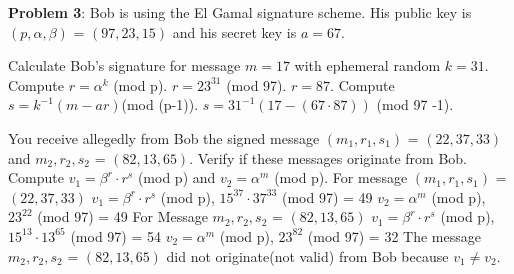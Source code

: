 \documentclass[12pt,letterpaper,final]{report}
\begin{document}
\bigskip

\noindent\textbf{Problem 3}: Bob is using the El Gamal signature scheme. His public key is $(p, \alpha, \beta)$ = $(97, 23, 15)$ and his secret key is $a = 67$.
\begin{alphlist}
	\item\indent Calculate Bob's signature for message $m = 17$ with ephemeral random $k = 31$.
	\newline
	 Compute $r = \alpha^{k}$ (mod p). $r = 23^{31}$ (mod 97). $ r = 87$.
	\newline\indent Compute $s = k^{-1}(m - ar)$(mod (p-1)). $s = 31^{-1}(17 - (67\cdot87))$ (mod 97 -1).
	\item\indent You receive allegedly from Bob the signed message $(m_{1}, r_{1}, s_{1})$ = $(22, 37, 33)$ and $m_{2}, r_{2}, s_{2}$ = $(82, 13, 65)$. Verify if these messages originate from Bob.
	\newline{} Compute $v_{1} = \beta^{r} \cdot r^{s}$ (mod p) and $v_{2} = \alpha^{m}$ (mod p).
	\newline For message $(m_{1}, r_{1}, s_{1})$ = $(22, 37, 33)$
	\newline $v_{1} = \beta^{r} \cdot r^{s}$ (mod p), $15^{37} \cdot 37^{33}$ (mod 97) = 49
	\newline $v_{2} = \alpha^{m}$ (mod p), $23^{22}$ (mod 97) = 49
	\newline For Message $m_{2}, r_{2}, s_{2}$ = $(82, 13, 65)$
	\newline $v_{1} = \beta^{r} \cdot r^{s}$ (mod p), $15^{13} \cdot 13^{65}$ (mod 97) = 54
	\newline $v_{2} = \alpha^{m}$ (mod p), $23^{82}$ (mod 97) = 32
	\newline The message  $m_{2}, r_{2}, s_{2}$ = $(82, 13, 65)$ did not originate(not valid) from Bob because $v_{1} \neq v_{2}$.
	\end{alphlist}
\end{document}
